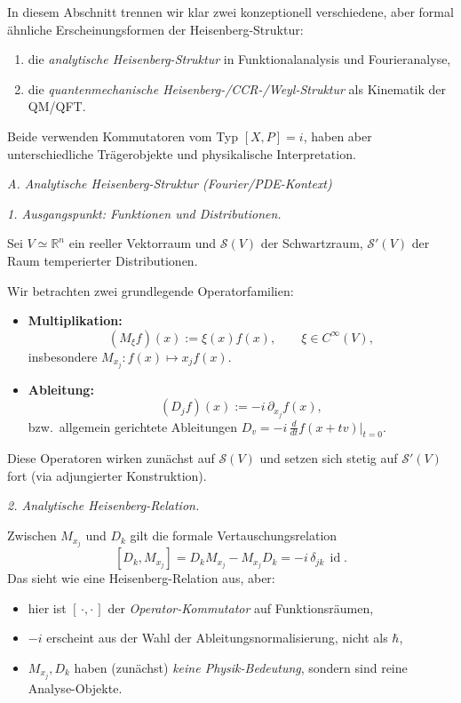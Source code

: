 \documentclass[10pt, letterpaper]{article}
\newcommand{\id}{\operatorname{id}}
\newcommand{\R}{\mathbb{R}}
\begin{document}
In diesem Abschnitt trennen wir klar zwei konzeptionell verschiedene,
aber formal ähnliche Erscheinungsformen der Heisenberg-Struktur:
\begin{enumerate}
  \item die \emph{analytische Heisenberg-Struktur} in Funktionalanalysis und Fourieranalyse,
  \item die \emph{quantenmechanische Heisenberg-/CCR-/Weyl-Struktur} als Kinematik der QM/QFT.
\end{enumerate}
Beide verwenden Kommutatoren vom Typ \([X,P]=i\), haben aber unterschiedliche
Trägerobjekte und physikalische Interpretation.

\emph{\emph{A. Analytische Heisenberg-Struktur (Fourier/PDE-Kontext)}}

\emph{1. Ausgangspunkt: Funktionen und Distributionen.}

Sei \(V\simeq\R^n\) ein reeller Vektorraum und \(\mathcal{S}(V)\) der Schwartzraum,
\(\mathcal{S}'(V)\) der Raum temperierter Distributionen.

Wir betrachten zwei grundlegende Operatorfamilien:
\begin{itemize}
  \item \textbf{Multiplikation:}
  \[
  (M_{\xi}f)(x):=\xi(x)f(x),\qquad \xi\in C^\infty(V),
  \]
  insbesondere \(M_{x_j}: f(x)\mapsto x_j f(x)\).

  \item \textbf{Ableitung:}
  \[
  (D_j f)(x):=-i\,\partial_{x_j} f(x),
  \]
  bzw.\ allgemein gerichtete Ableitungen \(D_v=-i\,\frac{d}{dt}f(x+tv)\big|_{t=0}\).
\end{itemize}

Diese Operatoren wirken zunächst auf \(\mathcal{S}(V)\)
und setzen sich stetig auf \(\mathcal{S}'(V)\) fort (via adjungierter Konstruktion).

\emph{2. Analytische Heisenberg-Relation.}

Zwischen \(M_{x_j}\) und \(D_k\) gilt die formale Vertauschungsrelation
\[
[D_k,M_{x_j}] = D_k M_{x_j} - M_{x_j} D_k
= -i\,\delta_{jk}\,\id.
\]
Das sieht wie eine Heisenberg-Relation aus, aber:
\begin{itemize}
  \item hier ist \([\,\cdot,\cdot\,]\) der \emph{Operator-Kommutator} auf Funktionsräumen,
  \item \(-i\) erscheint aus der Wahl der Ableitungsnormalisierung, nicht als \(\hbar\),
  \item \(M_{x_j},D_k\) haben (zunächst) \emph{keine Physik-Bedeutung}, sondern sind reine Analyse-Objekte.
\end{itemize}
\end{document}
